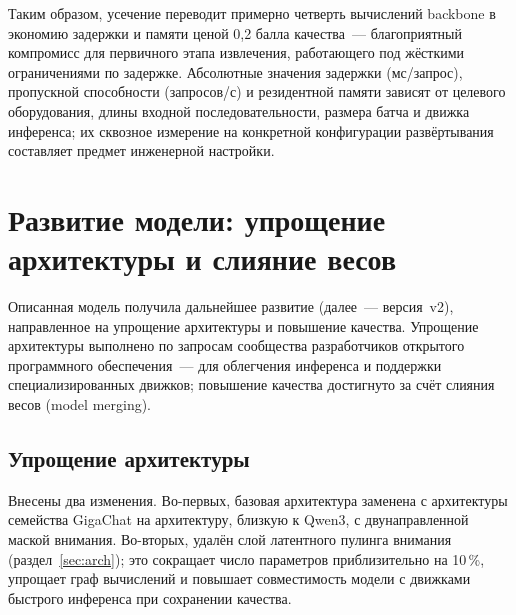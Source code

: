 \documentclass[12pt,a4paper]{article}
\begin{document}
Таким образом, усечение переводит примерно четверть вычислений backbone в
экономию задержки и памяти ценой 0{,}2 балла качества~--- благоприятный
компромисс для первичного этапа извлечения, работающего под жёсткими
ограничениями по задержке. Абсолютные значения задержки (мс/запрос), пропускной
способности (запросов/с) и резидентной памяти зависят от целевого оборудования,
длины входной последовательности, размера батча и движка инференса; их сквозное
измерение на конкретной конфигурации развёртывания составляет предмет инженерной
настройки.

\section{Развитие модели: упрощение архитектуры и слияние весов}\label{sec:v2}
Описанная модель получила дальнейшее развитие (далее~--- версия~v2),
направленное на упрощение архитектуры и повышение качества. Упрощение
архитектуры выполнено по запросам сообщества разработчиков открытого
программного обеспечения~--- для облегчения инференса и поддержки
специализированных движков; повышение качества достигнуто за счёт слияния весов
(model merging).

\subsection{Упрощение архитектуры}
Внесены два изменения. Во-первых, базовая архитектура заменена с архитектуры
семейства GigaChat на архитектуру, близкую к Qwen3, с двунаправленной маской
внимания. Во-вторых, удалён слой латентного пулинга внимания
(раздел~\ref{sec:arch}); это сокращает число параметров приблизительно на
10\,\%, упрощает граф вычислений и повышает совместимость модели с движками
быстрого инференса при сохранении качества.
\end{document}
